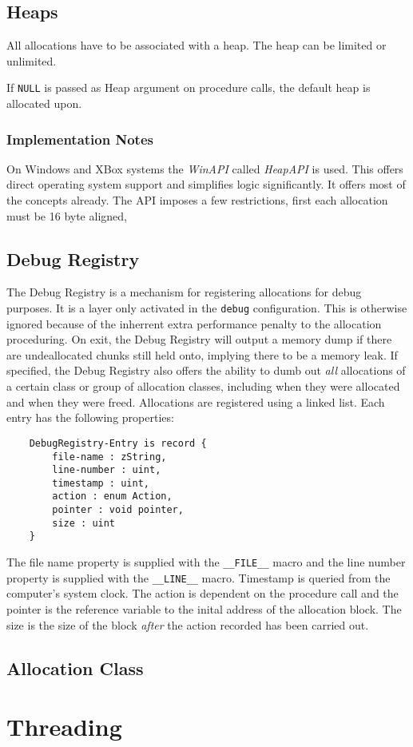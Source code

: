 \documentclass{report}
\begin{document}
\section{Heaps}
All allocations have to be associated with a heap. The heap can be limited or unlimited.


If \texttt{NULL} is passed as Heap argument on procedure calls, the default heap is allocated upon.

\subsection{Implementation Notes}
On Windows and XBox systems the \emph{WinAPI} called \emph{HeapAPI} is used. 
This offers direct operating system support and simplifies logic significantly.
It offers most of the concepts already. 
The API imposes a few restrictions, first each allocation must be 16 byte aligned, 

\section{Debug Registry}
The Debug Registry is a mechanism for registering allocations for debug purposes. 
It is a layer only activated in the \texttt{debug} configuration.
This is otherwise ignored because of the inherrent extra performance penalty to the allocation proceduring.
On exit, the Debug Registry will output a memory dump if there are undeallocated chunks still held onto, implying there to be a memory leak.
If specified, the Debug Registry also offers the ability to dumb out \emph{all} allocations of a certain class or group of allocation classes, including when they were allocated and when they were freed.
Allocations are registered using a linked list. Each entry has the following properties:
\begin{verbatim}
    DebugRegistry-Entry is record {
        file-name : zString,
        line-number : uint,
        timestamp : uint,
        action : enum Action,
        pointer : void pointer,
        size : uint
    }
\end{verbatim}
The file name property is supplied with the \texttt{\_\_FILE\_\_} macro and the line number property is supplied with the \texttt{\_\_LINE\_\_} macro.
Timestamp is queried from the computer's system clock.
The action is dependent on the procedure call and the pointer is the reference variable to the inital address of the allocation block.
The size is the size of the block \emph{after} the action recorded has been carried out.



\section{Allocation Class}






\chapter{Threading}
\end{document}
